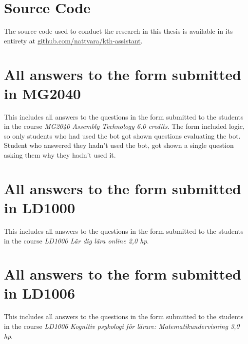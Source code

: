 ﻿\chapter{Source Code}
\label{appendix:source_code}


The source code used to conduct the research in this thesis is available in its entirety at \href{https://github.com/nattvara/kth-assistant}{github.com/nattvara/kth-assistant}.


\chapter{All answers to the form submitted in MG2040}
\label{appendix:mg2040_form}


This includes all answers to the questions in the form submitted to the students in the course \textit{MG2040 Assembly Technology 6.0 credits}. The form included logic, so only students who had used the bot got shown questions evaluating the bot. Student who answered they hadn’t used the bot, got shown a single question asking them why they hadn’t used it.





\chapter{All answers to the form submitted in LD1000}
\label{appendix:ld1000_form}


This includes all answers to the questions in the form submitted to the students in the course \textit{LD1000 Lär dig lära online 2,0 hp}.





\chapter{All answers to the form submitted in LD1006}
\label{appendix:ld1006_form}


This includes all answers to the questions in the form submitted to the students in the course \textit{LD1006 Kognitiv psykologi för lärare: Matematikundervisning 3,0 hp}.





\cleardoublepage